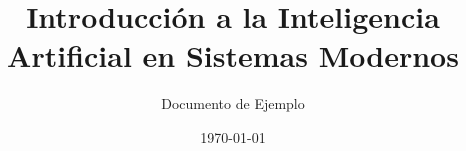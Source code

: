 \title{Introducción a la Inteligencia Artificial en Sistemas Modernos}
\author{Documento de Ejemplo}
\date{\today}
 
\maketitle

\tableofcontents
   
\newpage  